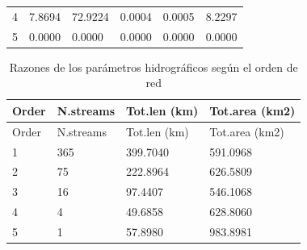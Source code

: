 \documentclass[11pt,]{article}
\begin{document}
\begin{longtable}[]{@{}llllll@{}}
\begin{minipage}[t]{0.13\columnwidth}
4\strut
\end{minipage} & \begin{minipage}[t]{0.13\columnwidth}\raggedright\strut
7.8694\strut
\end{minipage} & \begin{minipage}[t]{0.13\columnwidth}\raggedright\strut
72.9224\strut
\end{minipage} & \begin{minipage}[t]{0.13\columnwidth}\raggedright\strut
0.0004\strut
\end{minipage} & \begin{minipage}[t]{0.15\columnwidth}\raggedright\strut
0.0005\strut
\end{minipage} & \begin{minipage}[t]{0.15\columnwidth}\raggedright\strut
8.2297\strut
\end{minipage}\tabularnewline
\begin{minipage}[t]{0.13\columnwidth}\raggedright\strut
5\strut
\end{minipage} & \begin{minipage}[t]{0.13\columnwidth}\raggedright\strut
0.0000\strut
\end{minipage} & \begin{minipage}[t]{0.13\columnwidth}\raggedright\strut
0.0000\strut
\end{minipage} & \begin{minipage}[t]{0.13\columnwidth}\raggedright\strut
0.0000\strut
\end{minipage} & \begin{minipage}[t]{0.15\columnwidth}\raggedright\strut
0.0000\strut
\end{minipage} & \begin{minipage}[t]{0.15\columnwidth}\raggedright\strut
0.0000\strut
\end{minipage}\tabularnewline
\bottomrule
\end{longtable}

\begin{longtable}[]{@{}llll@{}}
\caption{\label{tablaseis}Razones de los parámetros hidrográficos según
el orden de red}\tabularnewline
\toprule
Order & N.streams & Tot.len (km) & Tot.area (km2)\tabularnewline
\midrule
\endfirsthead
\toprule
Order & N.streams & Tot.len (km) & Tot.area (km2)\tabularnewline
\midrule
\endhead
1 & 365 & 399.7040 & 591.0968\tabularnewline
2 & 75 & 222.8964 & 626.5809\tabularnewline
3 & 16 & 97.4407 & 546.1068\tabularnewline
4 & 4 & 49.6858 & 628.8060\tabularnewline
5 & 1 & 57.8980 & 983.8981\tabularnewline
\bottomrule
\end{longtable}
\end{document}
